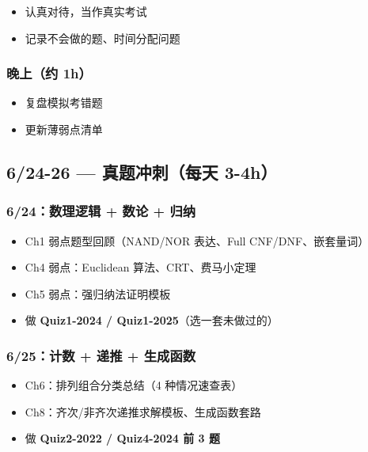 \documentclass[10pt,a4paper,openany]{ctexbook}
\theoremstyle{definition}
\theoremstyle{remark}
\begin{document}
\begin{itemize}
\item [ ] 认真对待，当作真实考试
\item [ ] 记录不会做的题、时间分配问题

\end{itemize}

\subsubsection{晚上（约 1h）}

\begin{itemize}
\item [ ] 复盘模拟考错题
\item [ ] 更新薄弱点清单

\end{itemize}

\vspace{-2pt}

\subsection{6/24-26 — 真题冲刺（每天 3-4h）}

\subsubsection{6/24：数理逻辑 + 数论 + 归纳}

\begin{itemize}
\item [ ] Ch1 弱点题型回顾（NAND/NOR 表达、Full CNF/DNF、嵌套量词）
\item [ ] Ch4 弱点：Euclidean 算法、CRT、费马小定理
\item [ ] Ch5 弱点：强归纳法证明模板
\item [ ] 做 \textbf{Quiz1-2024 / Quiz1-2025}（选一套未做过的）

\end{itemize}

\subsubsection{6/25：计数 + 递推 + 生成函数}

\begin{itemize}
\item [ ] Ch6：排列组合分类总结（4 种情况速查表）
\item [ ] Ch8：齐次/非齐次递推求解模板、生成函数套路
\item [ ] 做 \textbf{Quiz2-2022 / Quiz4-2024 前 3 题}

\end{itemize}
\end{document}
